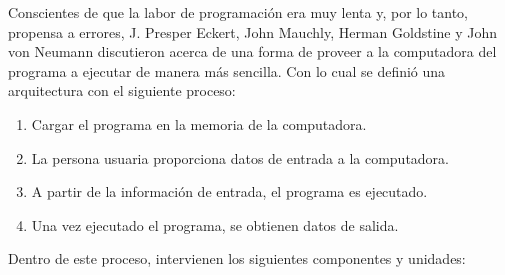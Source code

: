 \documentclass[11pt,spanish]{article}
\begin{document}
Conscientes de que la labor de programación era muy lenta y, por lo
tanto, propensa a errores, J. Presper Eckert, John Mauchly, Herman
Goldstine y John von Neumann discutieron acerca de una forma de proveer
a la computadora del programa a ejecutar de manera más sencilla.
Con lo cual se definió una arquitectura con el siguiente proceso:
\begin{enumerate}
\item Cargar el programa en la memoria de la computadora.
\item La persona usuaria proporciona datos de entrada a la computadora.
\item A partir de la información de entrada, el programa es ejecutado.
\item Una vez ejecutado el programa, se obtienen datos de salida.
\end{enumerate}
Dentro de este proceso, intervienen los siguientes componentes y unidades:
\cite{key-2}
\end{document}
